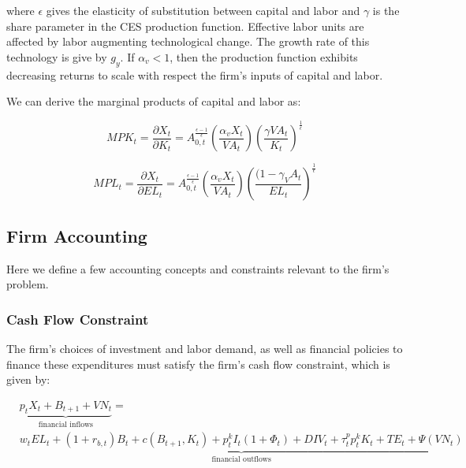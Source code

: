 \noindent\noindent where $\epsilon$ gives the elasticity of substitution between capital and labor and $\gamma$ is the share parameter in the CES production function.  Effective labor units are affected by labor augmenting technological change.  The growth rate of this technology is give by $g_{y}$.  If $\alpha_{v}<1$, then the production function exhibits decreasing returns to scale with respect the firm's inputs of capital and labor.

We can derive the marginal products of capital and labor as:

\begin{equation}
\label{eqn:mpk}
MPK_{t}=\frac{\partial X_{t}}{\partial K_{t}}=A_{0,t}^{\frac{\epsilon-1}{\epsilon}} \left(\frac{\alpha_{v}X_{t}}{VA_{t}}\right)\left(\frac{\gamma VA_{t}}{K_{t}}\right)^{\frac{1}{\epsilon}}
\end{equation}

\begin{equation}
\label{eqn:mpl}
MPL_{t}=\frac{\partial X_{t}}{\partial EL_{t}}=A_{0,t}^{\frac{\epsilon-1}{\epsilon}} \left(\frac{\alpha_{v}X_{t}}{VA_{t}}\right)\left(\frac{(1-\gamma_ VA_{t}}{EL_{t}}\right)^{\frac{1}{\epsilon}}
\end{equation}


\subsection{Firm Accounting}

Here we define a few accounting concepts and constraints relevant to the firm's problem.

\subsubsection{Cash Flow Constraint}
The firm's choices of investment and labor demand, as well as financial policies to finance these expenditures must satisfy the firm's cash flow constraint, which is given by:

\begin{equation}
\label{eqn:cash_flow}
\begin{split}
& \underbrace{p_{t}X_{t}+B_{t+1}+VN_{t}}_{\text{financial inflows}} =\\
 & \underbrace{w_{t}EL_{t} + (1+r_{b,t})B_{t} + c(B_{t+1},K_{t}) + p^{k}_{t}I_{t}(1+\Phi_{t}) + DIV_{t} + \tau^{p}_{t}p^{k}_{t}K_{t} + TE_{t} + \Psi(VN_{t})}_{\text{financial outflows}}
\end{split}
\end{equation}

